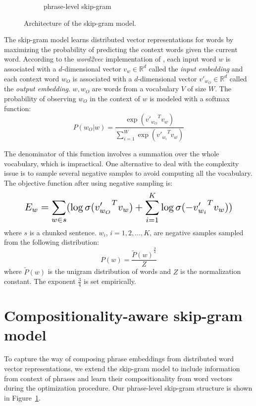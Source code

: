 \begin{figure}[!tbp]
{\begin{subfigure}[b]{0.55\textwidth}
    \caption{phrase-level skip-gram}
    \label{fig:1b}
\end{subfigure}
}
\caption{\small{Architecture of the skip-gram model.}}
\label{fig:skip-gram}
\vspace{-1em}
\end{figure}
The skip-gram model learns distributed vector representations for words by maximizing the probability of predicting
the context words given the current word. According to the \textit{word2vec} implementation of , 
each input word $w$ is associated with a $d$-dimensional vector $v_w \in {\mathbb{R}}^{d}$ called the \textit{input embedding} and 
each context word $w_O$ is associated with a $d$-dimensional vector $v'_{w_O} \in {\mathbb{R}}^{d}$ called the \textit{output embedding}. $w, w_O$ are words from a vocabulary $V$
of size $W$. The probability of observing $w_O$ in the context of $w$ is modeled with a softmax function:
\begin{equation}
P(w_O | w) = \frac{\exp({v'_{w_O}}^T v_w)}{\sum_{i=1}^W \exp({v'_{w_i}}^T v_w)}
\end{equation}


The denominator of this function involves a summation over the whole vocabulary, which is impractical. One alternative 
to deal with the complexity issue is to sample several negative samples to avoid computing all the vocabulary. The objective
function after using negative sampling is:
\begin{equation}
\resizebox{.87\hsize}{!}{$\displaystyle
    E_w = \sum_{w \in s} (\log \sigma ({v'_{w_O}}^T v_w) + \sum_{i=1}^{K} \log \sigma (-{v'_{w_i}}^T v_w))
$}
\end{equation}
where $s$ is a chunked sentence. $w_i$, $i=1, 2, \ldots ,K$, are negative samples sampled from the following distribution:
\begin{equation}
P(w) = \frac{{\widetilde{P}(w)}^{\frac{3}{4}}}{Z}
\end{equation}
where $\widetilde{P}(w)$ is the unigram distribution of words and $Z$ is the normalization constant. The exponent $\frac{3}{4}$ is 
set empirically.
\section{Compositionality-aware skip-gram model}
\label{sec:compose}
To capture the way of composing phrase embeddings from distributed word vector representations, we extend the skip-gram model to include information from 
context of phrases and learn their compositionality from word vectors during the optimization procedure. Our phrase-level skip-gram structure is shown in
Figure~\ref{fig:1b}. %
